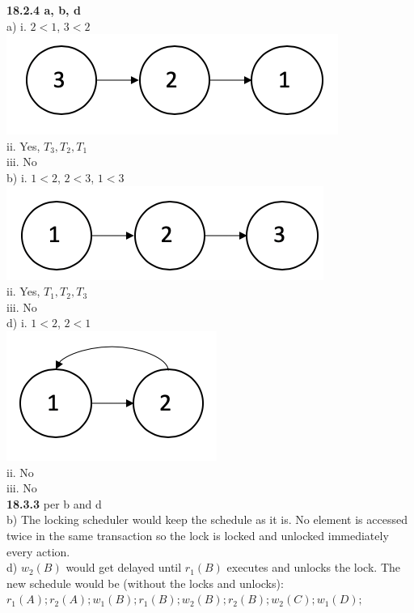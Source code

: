 \documentclass[12pt, letterpaper, fleqn]{article}
\begin{document}
  \textbf{18.2.4 a, b, d} \\
  a) i. $2 < 1$, $3 < 2$ \\
  \includegraphics[scale=0.5]{images/agraph.png} \\
  ii. Yes, $T_3, T_2, T_1$\\
  iii. No \\
  b) i. $1<2$, $2<3$, $1<3$ \\
  \includegraphics[scale=0.5]{images/bgraph.png} \\
  ii. Yes, $T_1, T_2, T_3$\\
  iii. No \\
  d) i. $1 < 2$, $2<1$\\
  \includegraphics[scale=0.5]{images/dgraph.png} \\
  ii. No \\
  iii. No \\


  \textbf{18.3.3} per b and d \\
  b) The locking scheduler would keep the schedule as it is. No element is
  accessed twice in the same transaction so the lock is locked and unlocked
  immediately every action.\\
  d) $w_2(B)$ would get delayed until $r_1(B)$ executes and unlocks the lock.
  The new schedule would be (without the locks and unlocks): \\
  $r_1(A); r_2(A); w_1(B); r_1(B); w_2(B);r_2(B); w_2(C); w_1(D);$

 
\end{document}
